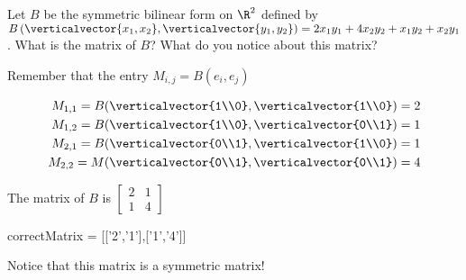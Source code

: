 \documentclass{ximera}
\begin{document}
\begin{question}
	Let $B$ be the symmetric bilinear form on $\R^2$ defined by 
	$B\left(\verticalvector{x_1,x_2},\verticalvector{y_1,y_2}\right) = 2x_1y_1+4x_2y_2+x_1y_2+x_2y_1$.  
	What is the matrix of $B$?  What do you notice about this matrix?
	\begin{solution}
		\begin{hint}
			Remember that the entry $M_{i,j} = B(e_i,e_j)$
		\end{hint}
		\begin{hint}
			\begin{align*}
				M_{1,1} = B(\verticalvector{1\\0},\verticalvector{1\\0}) = 2\\
				M_{1,2} = B(\verticalvector{1\\0},\verticalvector{0\\1}) = 1\\
				M_{2,1} = B(\verticalvector{0\\1},\verticalvector{1\\0}) = 1\\
				M_{2,2} = M(\verticalvector{0\\1},\verticalvector{0\\1}) = 4
			\end{align*}
		\end{hint}
		\begin{hint}
			The matrix of $B$ is \(\begin{bmatrix} 2 & 1 \\ 1 & 4\end{bmatrix}\)
		\end{hint}
		\begin{matrix-answer}
			correctMatrix = [['2','1'],['1','4']]
		\end{matrix-answer}
	\end{solution}
	Notice that this matrix is a symmetric matrix!
\end{question}
\end{document}
